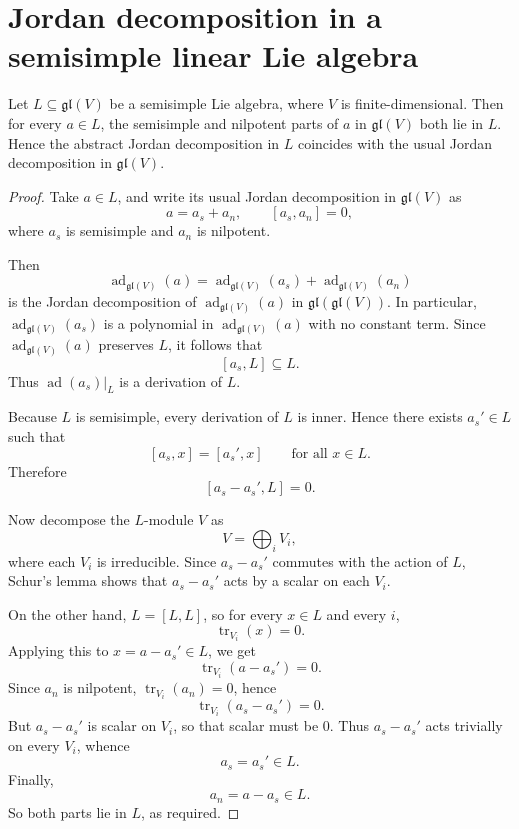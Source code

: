 \section{Jordan decomposition in a semisimple linear Lie algebra}

\begin{theorem}
    Let $L \subseteq \mathfrak{gl}(V)$ be a semisimple Lie algebra, where $V$ is finite-dimensional.
    Then for every $a \in L$, the semisimple and nilpotent parts of $a$ in $\mathfrak{gl}(V)$ both lie in $L$.
    Hence the abstract Jordan decomposition in $L$ coincides with the usual Jordan decomposition in $\mathfrak{gl}(V)$.
\end{theorem}

\begin{proof}
    Take $a \in L$, and write its usual Jordan decomposition in $\mathfrak{gl}(V)$ as
    \[
        a=a_s+a_n,
        \qquad [a_s,a_n]=0,
    \]
    where $a_s$ is semisimple and $a_n$ is nilpotent.

    Then
    \[
        \operatorname{ad}_{\mathfrak{gl}(V)}(a)
        =
        \operatorname{ad}_{\mathfrak{gl}(V)}(a_s)
        +
        \operatorname{ad}_{\mathfrak{gl}(V)}(a_n)
    \]
    is the Jordan decomposition of $\operatorname{ad}_{\mathfrak{gl}(V)}(a)$ in
    $\mathfrak{gl}(\mathfrak{gl}(V))$. In particular,
    $\operatorname{ad}_{\mathfrak{gl}(V)}(a_s)$ is a polynomial in
    $\operatorname{ad}_{\mathfrak{gl}(V)}(a)$ with no constant term. Since
    $\operatorname{ad}_{\mathfrak{gl}(V)}(a)$ preserves $L$, it follows that
    \[
        [a_s,L]\subseteq L.
    \]
    Thus $\operatorname{ad}(a_s)\vert_L$ is a derivation of $L$.

    Because $L$ is semisimple, every derivation of $L$ is inner. Hence there exists
    $a_s' \in L$ such that
    \[
        [a_s,x]=[a_s',x]
        \qquad \text{for all } x\in L.
    \]
    Therefore
    \[
        [a_s-a_s',L]=0.
    \]

    Now decompose the $L$-module $V$ as
    \[
        V=\bigoplus_i V_i,
    \]
    where each $V_i$ is irreducible. Since $a_s-a_s'$ commutes with the action of $L$,
    Schur's lemma shows that $a_s-a_s'$ acts by a scalar on each $V_i$.

    On the other hand, $L=[L,L]$, so for every $x\in L$ and every $i$,
    \[
        \operatorname{tr}_{V_i}(x)=0.
    \]
    Applying this to $x=a-a_s' \in L$, we get
    \[
        \operatorname{tr}_{V_i}(a-a_s')=0.
    \]
    Since $a_n$ is nilpotent, $\operatorname{tr}_{V_i}(a_n)=0$, hence
    \[
        \operatorname{tr}_{V_i}(a_s-a_s')=0.
    \]
    But $a_s-a_s'$ is scalar on $V_i$, so that scalar must be $0$. Thus
    $a_s-a_s'$ acts trivially on every $V_i$, whence
    \[
        a_s=a_s' \in L.
    \]
    Finally,
    \[
        a_n=a-a_s\in L.
    \]
    So both parts lie in $L$, as required.
\end{proof}

